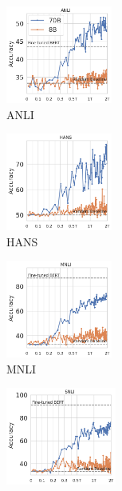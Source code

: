 \begin{figure}[t]
    \begin{subfigure}[b]{0.20\textwidth}
    \centering
    \includegraphics[height=3.2cm]{figures/anli_intermediate}
    \caption{ANLI}
    \end{subfigure}
    \label{fig:anli_int}
    \begin{subfigure}[b]{0.19\textwidth}
    \centering
    \includegraphics[height=3.2cm, trim=11mm 0 0 0, clip]{figures/hansnli_intermediate}
    \caption{HANS}
    \label{fig:hans_int}
    \end{subfigure}
    \begin{subfigure}[b]{0.19\textwidth}
    \centering
    \includegraphics[height=3.2cm, trim=11mm 0 0 0, clip]{figures/mnli_matched_intermediate}
    \caption{MNLI}
    \label{fig:mnli_int}
    \end{subfigure}
    \begin{subfigure}[b]{0.19\textwidth}
    \centering
    \includegraphics[height=3.2cm, trim=11mm 0 0 0, clip]{figures/snli_intermediate}

\end{subfigure}
\end{figure}
